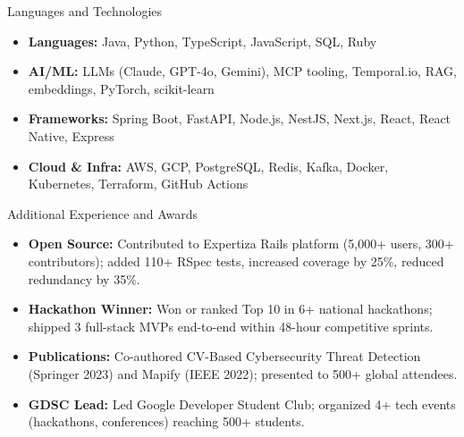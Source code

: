 \documentclass[]{mcdowellcv}
\begin{document}
\begin{cvsection}{Languages and Technologies}
  \begin{cvsubsection}{}{}{}
    \begin{itemize}
      \item \textbf{Languages:} Java, Python, TypeScript, JavaScript, SQL, Ruby
      \item \textbf{AI/ML:} LLMs (Claude, GPT-4o, Gemini), MCP tooling, Temporal.io, RAG, embeddings, PyTorch, scikit-learn
      \item \textbf{Frameworks:} Spring Boot, FastAPI, Node.js, NestJS, Next.js, React, React Native, Express
      \item \textbf{Cloud \& Infra:} AWS, GCP, PostgreSQL, Redis, Kafka, Docker, Kubernetes, Terraform, GitHub Actions
    \end{itemize}
  \end{cvsubsection}
\end{cvsection}

\begin{cvsection}{Additional Experience and Awards}
  \begin{cvsubsection}{}{}{}
    \begin{itemize}
      \item \textbf{Open Source:} Contributed to Expertiza Rails platform (5,000+ users, 300+ contributors); added 110+ RSpec tests, increased coverage by 25\%, reduced redundancy by 35\%.
      \item \textbf{Hackathon Winner:} Won or ranked Top 10 in 6+ national hackathons; shipped 3 full-stack MVPs end-to-end within 48-hour competitive sprints.
      \item \textbf{Publications:} Co-authored CV-Based Cybersecurity Threat Detection (Springer 2023) and Mapify (IEEE 2022); presented to 500+ global attendees.
      \item \textbf{GDSC Lead:} Led Google Developer Student Club; organized 4+ tech events (hackathons, conferences) reaching 500+ students.
    \end{itemize}
  \end{cvsubsection}
\end{cvsection}
\end{document}
